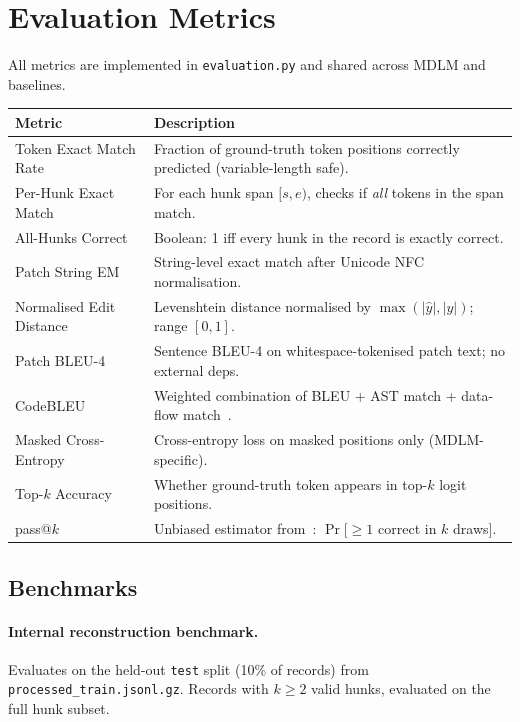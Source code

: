 \documentclass[11pt,a4paper]{article}
\begin{document}
\section{Evaluation Metrics}
\label{sec:metrics}

All metrics are implemented in \texttt{evaluation.py} and shared across MDLM and baselines.

\begin{center}
\renewcommand{\arraystretch}{1.25}
\begin{tabular}{p{4.5cm} p{8.5cm}}
\toprule
\textbf{Metric} & \textbf{Description} \\
\midrule
Token Exact Match Rate & Fraction of ground-truth token positions correctly predicted (variable-length safe). \\[2pt]
Per-Hunk Exact Match & For each hunk span $[s, e)$, checks if \emph{all} tokens in the span match. \\[2pt]
All-Hunks Correct & Boolean: 1 iff every hunk in the record is exactly correct. \\[2pt]
Patch String EM & String-level exact match after Unicode NFC normalisation. \\[2pt]
Normalised Edit Distance & Levenshtein distance normalised by $\max(|\hat{y}|, |y|)$; range $[0,1]$. \\[2pt]
Patch BLEU-4 & Sentence BLEU-4 on whitespace-tokenised patch text; no external deps. \\[2pt]
CodeBLEU & Weighted combination of BLEU + AST match + data-flow match~\cite{codebleu}. \\[2pt]
Masked Cross-Entropy & Cross-entropy loss on masked positions only (MDLM-specific). \\[2pt]
Top-$k$ Accuracy & Whether ground-truth token appears in top-$k$ logit positions. \\[2pt]
pass@$k$ & Unbiased estimator from~\cite{humaneval}: $\Pr[\geq 1$ correct in $k$ draws$]$. \\
\bottomrule
\end{tabular}
\end{center}

\subsection{Benchmarks}

\paragraph{Internal reconstruction benchmark.} Evaluates on the held-out \texttt{test} split (10\% of records) from \texttt{processed\_train.jsonl.gz}. Records with $k \geq 2$ valid hunks, evaluated on the full hunk subset.
\end{document}
